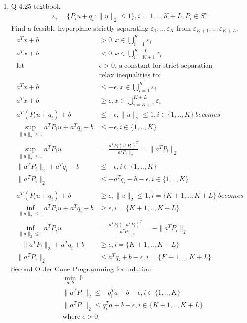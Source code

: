 \documentclass[12pt,letter]{article}
\newcommand{\norm}[1]{\|#1\|}
\newcommand{\set}[1]{\{#1\}}
\begin{document}
\begin{enumerate}
  \pagebreak
  
\item Q 4.25 textbook
  \begin{align*}
    \varepsilon_i = \set{P_i u + q_i: \norm{u}_2 \leq 1}, i=1,..,K+L, P_i \in S^n
  \end{align*}
  Find a feasible hyperplane strictly separating $\varepsilon_1,..,\varepsilon_K$ from $\varepsilon_{K+1},..,\varepsilon_{K+L}$.
  \begin{align*}
    a^Tx+b &> 0, x \in \bigcup_{i=1}^K \varepsilon_i\\
    a^Tx+b &< 0, x \in \bigcup_{i=K+1}^{K+L} \varepsilon_i\\
    \text{let } &\epsilon > 0 \text{, a constant for strict separation}\\
    &\text{relax inequalities to:}\\
    a^Tx+b &\leq -\epsilon, x \in \bigcup_{i=1}^K \varepsilon_i\\
    a^Tx+b &\geq \epsilon, x \in \bigcup_{i=K+1}^{K+L} \varepsilon_i\\
    a^T(P_iu+q_i)+b &\leq -\epsilon, \norm{u}_2 \leq 1, i\in\{1,..,K\}\ becomes\\
    \sup_{\norm{u}_2 \leq 1} a^TP_iu + a^Tq_i + b &\leq -\epsilon, i\in\{1,..,K\}\\
    \sup_{\norm{u}_2 \leq 1} a^TP_iu &= \frac{a^TP_i (a^TP_i)^T}{\norm{a^TP_i}_2} = \norm{a^TP_i}_2\\
    \norm{a^TP_i}_2 + a^Tq_i + b &\leq -\epsilon, i\in\{1,..,K\}\\
    \norm{a^TP_i}_2 &\leq -a^Tq_i - b  -\epsilon, i\in\{1,..,K\}\\
    \\
    a^T(P_iu+q_i)+b &\geq \epsilon, \norm{u}_2 \leq 1, i=\{K+1,..,K+L\} \ becomes\\
    \inf_{\norm{u}_2 \leq 1} a^TP_iu + a^Tq_i + b &\geq \epsilon, i=\{K+1,..,K+L\}\\
    \inf_{\norm{u}_2 \leq 1} a^TP_iu &= \frac{a^TP_i (-a^TP_i)^T}{\norm{a^TP_i}_2} = -\norm{a^TP_i}_2\\
    -\norm{a^TP_i}_2 + a^Tq_i + b &\geq \epsilon, i=\{K+1,..,K+L\}\\
    \norm{a^TP_i}_2 &\leq a^Tq_i + b -\epsilon, i=\{K+1,..,K+L\}
  \end{align*}
  Second Order Cone Programming formulation:
  \begin{align*}
    &\min_{a,b}\ 0\\
    &\norm{a^TP_i}_2 \leq -q_i^Ta - b  -\epsilon, i\in\{1,..,K\}\\
    &\norm{a^TP_i}_2 \leq q_i^Ta + b -\epsilon, i\in\{K+1,..,K+L\}\\
    &\text{where } \epsilon > 0
  \end{align*}


\end{enumerate}
\end{document}
